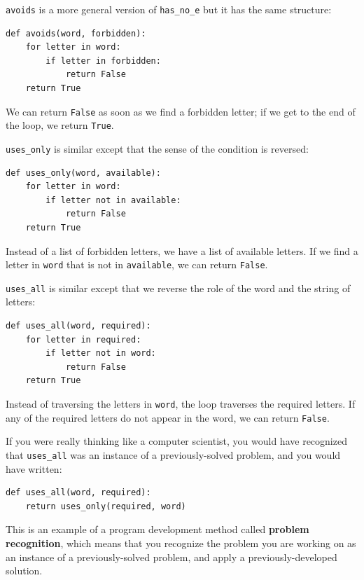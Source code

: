 \documentclass[10pt]{book}
\begin{document}
\begin{CJK}{UTF8}{gbsn}


{\tt avoids} is a more general version of \verb"has_no_e" but it
has the same structure:

\begin{verbatim}
def avoids(word, forbidden):
    for letter in word:
        if letter in forbidden:
            return False
    return True
\end{verbatim}
%
We can return {\tt False} as soon as we find a forbidden letter;
if we get to the end of the loop, we return {\tt True}.

\verb"uses_only" is similar except that the sense of the condition
is reversed:

\begin{verbatim}
def uses_only(word, available):
    for letter in word: 
        if letter not in available:
            return False
    return True
\end{verbatim}
%
Instead of a list of forbidden letters, we have a list of available
letters.  If we find a letter in {\tt word} that is not in
{\tt available}, we can return {\tt False}.

\verb"uses_all" is similar except that we reverse the role
of the word and the string of letters:

\begin{verbatim}
def uses_all(word, required):
    for letter in required: 
        if letter not in word:
            return False
    return True
\end{verbatim}
%
Instead of traversing the letters in {\tt word}, the loop
traverses the required letters.  If any of the required letters
do not appear in the word, we can return {\tt False}.

If you were really thinking like a computer scientist, you would
have recognized that \verb"uses_all" was an instance of a
previously-solved problem, and you would have written:

\begin{verbatim}
def uses_all(word, required):
    return uses_only(required, word)
\end{verbatim}
%
This is an example of a program development method called {\bf problem
recognition}, which means that you recognize the problem you are
working on as an instance of a previously-solved problem, and apply a
previously-developed solution.



\end{CJK}
\end{document}
